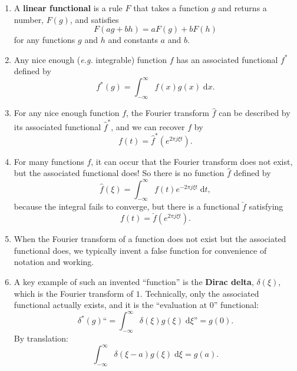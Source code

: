 \documentclass{article}
\newcommand{\diff}{\;\mathrm{d}}
\begin{document}
\begin{enumerate}
	\item A \textbf{linear functional} is a rule $F$ that takes a function $g$ and returns a number, $F(g)$, and satisfies
		\[F(ag+bh)=aF(g)+bF(h)\]
		for any functions $g$ and $h$ and constants $a$ and $b$.
	\item Any nice enough (\textit{e.g.} integrable) function $f$ has an associated functional $f^*$ defined by
		\[f^*(g)=\int_{-\infty}^\infty f(x)g(x)\diff x.\]
	\item For any nice enough function $f$, the Fourier transform $\hat{f}$ can be described by its associated functional $\hat{f}^*$, and we can recover $f$ by
		\[f(t)=\hat{f}^*\left(e^{2\pi j\xi t}\right).\]
	\item For many functions $f$, it can occur that the Fourier transform does not exist, but the associated functional does! So there is no function $\hat{f}$ defined by
		\[\hat{f}(\xi)=\int_{-\infty}^\infty f(t)e^{-2\pi j\xi t}\diff t,\]
		because the integral fails to converge, but there is a functional $\check{f}$ satisfying
		\[f(t)=\check{f}\left(e^{2\pi j\xi t}\right).\]
	\item When the Fourier transform of a function does not exist but the associated functional does, we typically invent a false function for convenience of notation and working.
	\item A key example of such an invented ``function'' is the \textbf{Dirac delta}, $\delta(\xi)$, which is the Fourier transform of $1$. Technically, only the associated functional actually exists, and it is the ``evaluation at 0'' functional:
		\[\delta^*(g)\text{``$=\int_{-\infty}^\infty \delta(\xi)g(\xi)\diff \xi$''} = g(0).\]
		By translation:
		\[\int_{-\infty}^\infty \delta(\xi - a)g(\xi)\diff\xi = g(a).\]
\end{enumerate}
\end{document}
